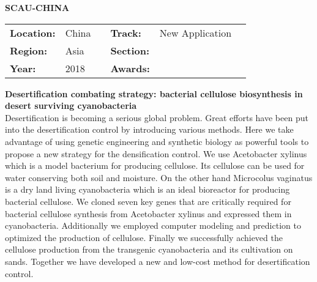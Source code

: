 \textbf{\uppercase{SCAU-China}} \FloatBarrier \begin{table}[h] \begin{tabular}{lp{2.5cm}llll} \textbf{Location:} & China & \multicolumn{1}{|l}{} & \textbf{Track:}   & New Application \\ \textbf{Region:}   & Asia   & \multicolumn{1}{|l}{} & \textbf{Section:} &  \\ \textbf{Year:}     & 2018   & \multicolumn{1}{|l}{} & \textbf{Awards:}  & \end{tabular} \end{table} \FloatBarrier \noindent\textbf{Desertification combating strategy: bacterial cellulose biosynthesis in desert surviving cyanobacteria} \vspace{.2cm}\\ 
Desertification is becoming a serious global problem. Great efforts have been put into the desertification control by introducing various methods. Here we take advantage of using genetic engineering and synthetic biology as powerful tools to propose a new strategy for the densification control. We use Acetobacter xylinus which is a model bacterium for producing cellulose. Its cellulose can be used for water conserving both soil and moisture. On the other hand Microcolus vaginatus is a dry land living cyanobacteria which is an ideal bioreactor for producing bacterial cellulose. We cloned seven key genes that are critically required for bacterial cellulose synthesis from Acetobacter xylinus and expressed them in cyanobacteria. Additionally we employed computer modeling and prediction to optimized the production of cellulose. Finally we successfully achieved the cellulose production from the transgenic cyanobacteria and its cultivation on sands. Together we have developed a new and low-cost method for desertification control. 
\vspace{2cm}

